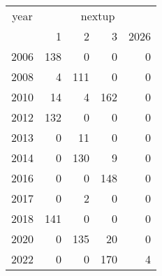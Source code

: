 \footnotesize\begin{tabular}[t]{lrrrr}
\toprule
\multicolumn{1}{c}{year} & \multicolumn{4}{c}{nextup} \\
\cmidrule(l{3pt}r{3pt}){1-1} \cmidrule(l{3pt}r{3pt}){2-5}
  & 1 & 2 & 3 & 2026\\
\midrule
2006 & 138 & 0 & 0 & 0\\
2008 & 4 & 111 & 0 & 0\\
2010 & 14 & 4 & 162 & 0\\
2012 & 132 & 0 & 0 & 0\\
2013 & 0 & 11 & 0 & 0\\
2014 & 0 & 130 & 9 & 0\\
2016 & 0 & 0 & 148 & 0\\
2017 & 0 & 2 & 0 & 0\\
2018 & 141 & 0 & 0 & 0\\
2020 & 0 & 135 & 20 & 0\\
2022 & 0 & 0 & 170 & 4\\
\bottomrule
\end{tabular}
